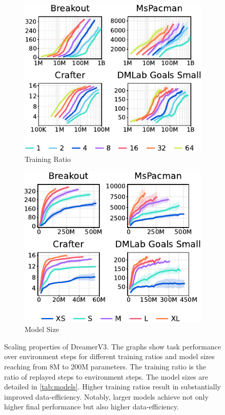 \begin{figure}[t]
\captionsetup[subfigure]{justification=centering}
\centering
%
\begin{subfigure}{.47\textwidth}
\includegraphics[width=\linewidth]{scaling/scaling_train}
\caption{Training Ratio}
\end{subfigure}%
\hfill%
\begin{subfigure}{.47\textwidth}
\includegraphics[width=\linewidth]{scaling/scaling_model}
\caption{Model Size}
\end{subfigure}%
\vspace{-1ex}%
\caption{Scaling properties of DreamerV3. The graphs show task performance over environment steps for different training ratios and model sizes reaching from 8M to 200M parameters. The training ratio is the ratio of replayed steps to environment steps. The model sizes are detailed in \cref{tab:models}. Higher training ratios result in substantially improved data-efficiency. Notably, larger models achieve not only higher final performance but also higher data-efficiency.}
\label{fig:scaling}
\end{figure}
